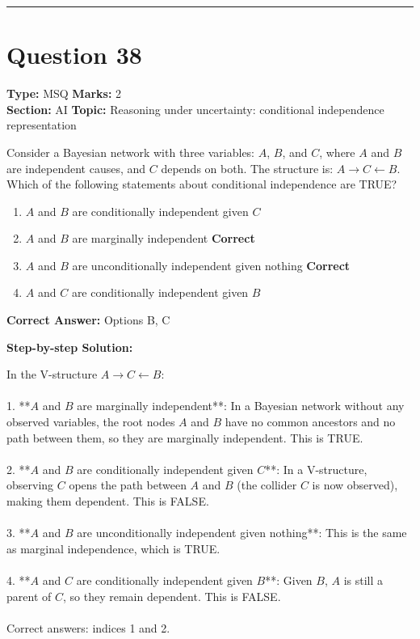 \documentclass[11pt]{article}
\begin{document}
\vspace{0.8em}
\hrule
\vspace{0.4em}
\section*{Question 38}
\textbf{Type:} MSQ \hfill \textbf{Marks:} 2\\
\textbf{Section:} AI \hfill \textbf{Topic:} Reasoning under uncertainty: conditional independence representation

Consider a Bayesian network with three variables: \(A\), \(B\), and \(C\), where \(A\) and \(B\) are independent causes, and \(C\) depends on both. The structure is: \(A \to C \leftarrow B\). Which of the following statements about conditional independence are TRUE?


\begin{enumerate}[label=\textbf{\Alph*.}, leftmargin=1.8em]
\item \(A\) and \(B\) are conditionally independent given \(C\)\item \(A\) and \(B\) are marginally independent \hfill {\color{gategreen}\textbf{Correct}}\item \(A\) and \(B\) are unconditionally independent given nothing \hfill {\color{gategreen}\textbf{Correct}}\item \(A\) and \(C\) are conditionally independent given \(B\)\end{enumerate}

\textbf{Correct Answer:} Options B, C

\textbf{Step-by-step Solution:}

In the V-structure \(A \to C \leftarrow B\): \\
\\
1. **\(A\) and \(B\) are marginally independent**: In a Bayesian network without any observed variables, the root nodes \(A\) and \(B\) have no common ancestors and no path between them, so they are marginally independent. This is TRUE.\\
\\
2. **\(A\) and \(B\) are conditionally independent given \(C\)**: In a V-structure, observing \(C\) opens the path between \(A\) and \(B\) (the collider \(C\) is now observed), making them dependent. This is FALSE.\\
\\
3. **\(A\) and \(B\) are unconditionally independent given nothing**: This is the same as marginal independence, which is TRUE.\\
\\
4. **\(A\) and \(C\) are conditionally independent given \(B\)**: Given \(B\), \(A\) is still a parent of \(C\), so they remain dependent. This is FALSE.\\
\\
Correct answers: indices 1 and 2.
\end{document}
